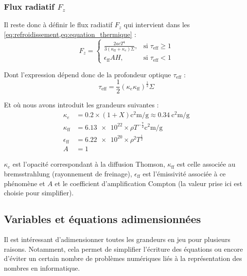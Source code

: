 \subsubsection{\texorpdfstring{Flux radiatif $F_z$}{Flux radiatif Fz}}

Il reste donc à définir le flux radiatif $F_z$ qui intervient dans les
\cref{eq:refroidissement,eq:equation_thermique} :
\begin{equation}
    \label{eq:flux}
    F_z =
    \begin{cases}
        \frac{2 a c T^4}{3 (\kappa_\mathrm{ff} + \kappa_e)\Sigma}, &\text{si $\tau_\mathrm{eff} \geq 1$} \\
        \epsilon_\mathrm{ff} A H, &\text{si $\tau_\mathrm{eff} < 1$}
    \end{cases}
\end{equation}

Dont l’expression dépend donc de la profondeur optique $\tau_\mathrm{eff}$ :
\begin{equation}
    \label{eq:tau_eff}
    \tau_\mathrm{eff} = \frac{1}{2} (\kappa_e \kappa_\mathrm{ff})^\frac{1}{2} \Sigma
\end{equation}

Et où nous avons introduit les grandeurs suivantes :
\begin{align}
    \label{eq:opacite_thomson}
    \kappa_e &= 0.2 \times (1 + X) \si{\square\centi\meter\per\gram} \approx \SI{0.34}{\square\centi\meter\per\gram} \\
    \label{eq:opacite_bremsstrahlung}
    \kappa_\mathrm{ff} &= \num{6.13e22} \times \rho T^{-\frac{7}{2}} \si{\square\centi\meter\per\gram}\\
    \label{eq:emissivite}
    \epsilon_\mathrm{ff} &= \num{6.22e20} \times \rho^2 T^\frac{1}{2} \\
    A &= 1
\end{align}

$\kappa_e$ est l’opacité correspondant à la diffusion Thomson,
$\kappa_\mathrm{ff}$ est celle associée au bremsstrahlung (rayonnement de
freinage), $\epsilon_\mathrm{ff}$ est l’émissivité associée à ce phénomène et
$A$ et le coefficient d’amplification Compton (la valeur prise ici est choisie
pour simplifier).

\subsection{Variables et équations adimensionnées}

Il est intéressant d’adimensionner toutes les grandeurs en jeu pour plusieurs
raisons. Notamment, cela permet de simplifier l’écriture des équations ou
encore d’éviter un certain nombre de problèmes numériques liés à la
représentation des nombres en informatique.

